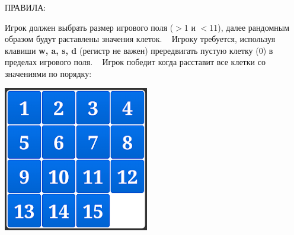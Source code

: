 ПРАВИЛА\+:

Игрок должен выбрать размер игрового поля ($>$1 и $<$11), далее рандомным образом будут раставлены значения клеток. ~\newline
 Игроку требуется, используя клавиши {\bfseries{w, a, s, d}} (регистр не важен) прередвигать пустую клетку (0) в пределах игрового поля. ~\newline
 Игрок победит когда расставит все клетки со значениями по порядку\+:  
\begin{DoxyImageNoCaption}
  \mbox{\includegraphics[width=\textwidth,height=\textheight/2,keepaspectratio=true]{game.webp}}
\end{DoxyImageNoCaption}
   